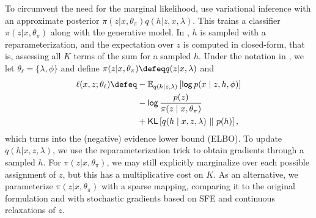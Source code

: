 To circumvent the need for the marginal likelihood,
\citet{KingmaEtAl2014SSVAE} use variational inference
\citep{Jordan+1999:VI} with an approximate posterior $\pi(z|x,
    \theta_\pi)q(h|z,x, \lambda)$. This trains a
classifier $\pi(z|x, \theta_\pi)$ along with the generative model. In
\citet{KingmaEtAl2014SSVAE}, $h$ is sampled with a
reparameterization, and the expectation over $z$ is computed in
closed-form, that is, assessing all $K$ terms of the sum for a
sampled $h$. Under the notation in ,
we let $\theta_\ell = \{\lambda, \phi\}$ and define
$\pi(z|x, \theta_\pi) \defeq q(z|x, \lambda)$ and
%
\begin{align}
    \begin{split}
        \ell(x, z; \theta_\ell) \defeq
        & - \mathbb E_{q(h|z,  \lambda)}\left[ \log p(x \mid z, h, \phi) \right] \\
        & - \log \frac{p(z)}{\pi(z \mid x, \theta_\pi)}                          \\
        & + \KL\left[q(h \mid x, z, \lambda) \,\,\|\,\, p(h)\right],
        \label{eq:elbonotation}
    \end{split}
\end{align}
%
which turns  into the (negative) evidence lower bound
(ELBO). To update $q(h | x, z, \lambda)$, we use the
reparameterization trick to obtain gradients through a sampled $h$.
For $\pi(z | x, \theta_\pi)$, we may still explicitly marginalize over
each possible assignment of $z$, but this has a multiplicative cost
on $K$. As an alternative, we parameterize $\pi(z|x,
    \theta_\pi)$ with a sparse mapping, comparing it to the original
formulation and with stochastic gradients based on SFE and continuous
relaxations of $z$.

